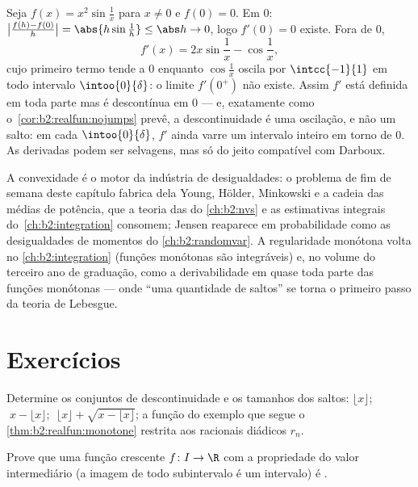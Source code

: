 \begin{example}\label{ex:b2:realfun:oscillation}
Seja $f(x) = x^2\sin\frac1x$ para $x \neq 0$ e $f(0) = 0$. Em
$0$: $\bigl|\frac{f(h) - f(0)}{h}\bigr| = \abs{h\sin\frac1h}
\leq \abs h \to 0$, logo $f'(0) = 0$ existe. Fora de $0$,
\[
f'(x) = 2x\sin\frac1x - \cos\frac1x ,
\]
cujo primeiro termo tende a $0$ enquanto $\cos\frac1x$ oscila
por $\intcc{-1}{1}$ em todo intervalo $\intoo{0}{\delta}$: o
limite $f'(0^+)$ não existe. Assim $f'$ está definida em toda parte mas é
descontínua em $0$ --- e, exatamente como
o~\cref{cor:b2:realfun:nojumps} prevê, a descontinuidade é uma
oscilação, e não um salto: em cada $\intoo{0}{\delta}$, $f'$ ainda
varre um intervalo inteiro em torno de $0$. As derivadas podem ser selvagens, mas
só do jeito compatível com Darboux.
\end{example}

\begin{remark}
A convexidade é o motor da indústria de desigualdades: o
problema de fim de semana deste capítulo fabrica dela Young, Hölder, Minkowski
e a cadeia das médias de potência, que a teoria das  do
\cref{ch:b2:nvs} e as estimativas integrais do~\cref{ch:b2:integration} consomem;
Jensen reaparece em probabilidade como as desigualdades de momentos do
\cref{ch:b2:randomvar}. A regularidade monótona volta no
\cref{ch:b2:integration} (funções monótonas são integráveis) e,
no volume do terceiro ano de graduação, como a derivabilidade em quase toda parte
das funções monótonas --- onde ``uma quantidade  de saltos'' se torna
o primeiro passo da teoria de Lebesgue.
\end{remark}

\section{Exercícios}

\begin{exercise}[$\star$]\label{exo:b2:realfun:1}
Determine os conjuntos de descontinuidade e os tamanhos dos saltos: $\lfloor x
\rfloor$; $\;x - \lfloor x\rfloor$; $\;\lfloor x \rfloor + \sqrt{x
- \lfloor x\rfloor}$; a função do exemplo que segue o
\cref{thm:b2:realfun:monotone} restrita aos racionais diádicos
$r_n$.
\end{exercise}

\begin{exercise}[$\star$]\label{exo:b2:realfun:2}
Prove que uma função crescente $f \colon I \to \R$ com a
propriedade do valor intermediário (a imagem de todo subintervalo é um
intervalo) é .
\end{exercise}

